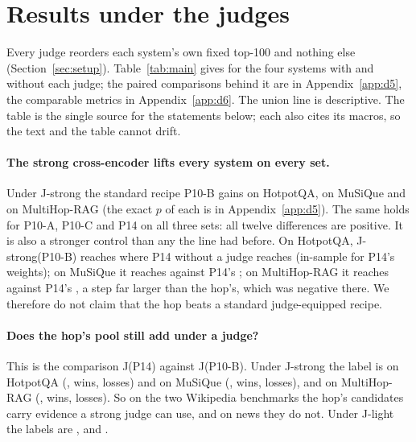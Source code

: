 \section{Results under the judges}
\label{sec:judges}

Every judge reorders each system's own fixed top-100 and nothing else (Section~\ref{sec:setup}).
Table~\ref{tab:main} gives \FS{} for the four systems with and without each judge; the paired
comparisons behind it are in Appendix~\ref{app:d5}, the comparable metrics in
Appendix~\ref{app:d6}. The union line is descriptive. The table is the single source for the
statements below; each also cites its macros, so the text and the table cannot drift.

\begin{table}[t]
\centering
\small
\caption{\capMainResult{} $^\dagger$ marks a descriptive union line.}
\label{tab:main}
\end{table}

\paragraph{The strong cross-encoder lifts every system on every set.} Under J-strong the
standard recipe P10-B gains \deltaStrongPTenBHotpot\pp{} on HotpotQA, \deltaStrongPTenBMusique\pp{} on
MuSiQue and \deltaStrongPTenBMultihop\pp{} on MultiHop-RAG (the exact $p$ of each is in
Appendix~\ref{app:d5}). The same holds for P10-A, P10-C and P14 on all three
sets: all twelve differences are positive. It is also a stronger control than any the line had
before. On HotpotQA, J-strong(P10-B) reaches \fsPctStrongPTenBHotpot{} where P14 without a judge
reaches \fsPctPFourteenHotpot{} (in-sample for P14's weights); on MuSiQue it reaches
\fsPctStrongPTenBMusique{} against P14's \fsPctPFourteenMusique{}; on MultiHop-RAG it reaches
\fsPctStrongPTenBMultihop{} against P14's \fsPctPFourteenMultihop{}, a step far larger than the hop's, which was
negative there. We therefore do not claim that the hop beats a standard judge-equipped recipe.

\paragraph{Does the hop's pool still add under a judge?} This is the comparison J(P14) against
J(P10-B). Under J-strong the label is \texttt{} on HotpotQA
(\deltaStrongHopHotpot\pp, \winsStrongHopHotpot{} wins, \lossesStrongHopHotpot{} losses) and
\texttt{} on MuSiQue (\deltaStrongHopMusique\pp, \winsStrongHopMusique{} wins,
\lossesStrongHopMusique{} losses), and \texttt{} on MultiHop-RAG
(\deltaStrongHopMultihop\pp, \winsStrongHopMultihop{} wins, \lossesStrongHopMultihop{} losses). So on the two
Wikipedia benchmarks the hop's candidates carry evidence a strong judge can use, and on news they
do not. Under J-light the labels are \texttt{}, \texttt{} and
\texttt{}.

